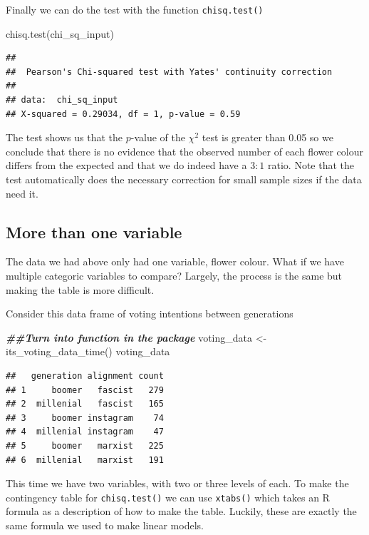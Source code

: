 \documentclass[
]{book}
\newenvironment{Shaded}{\begin{snugshade}}{\end{snugshade}}
\newcommand{\DocumentationTok}[1]{\textcolor[rgb]{0.56,0.35,0.01}{\textbf{\textit{#1}}}}
\newcommand{\FunctionTok}[1]{\textcolor[rgb]{0.00,0.00,0.00}{#1}}
\newcommand{\NormalTok}[1]{#1}
\newcommand{\OtherTok}[1]{\textcolor[rgb]{0.56,0.35,0.01}{#1}}
\begin{document}
Finally we can do the test with the function \texttt{chisq.test()}

\begin{Shaded}
\begin{Highlighting}[]
\FunctionTok{chisq.test}\NormalTok{(chi\_sq\_input)}
\end{Highlighting}
\end{Shaded}

\begin{verbatim}
## 
## 	Pearson's Chi-squared test with Yates' continuity correction
## 
## data:  chi_sq_input
## X-squared = 0.29034, df = 1, p-value = 0.59
\end{verbatim}

The test shows us that the \(p\)-value of the \(\chi^2\) test is greater than 0.05 so we conclude that there is no evidence that the observed number of each flower colour differs from the expected and that we do indeed have a \(3:1\) ratio. Note that the test automatically does the necessary correction for small sample sizes if the data need it.

\hypertarget{more-than-one-variable}{%
\subsection{More than one variable}\label{more-than-one-variable}}

The data we had above only had one variable, flower colour. What if we have multiple categoric variables to compare? Largely, the process is the same but making the table is more difficult.

Consider this data frame of voting intentions between generations

\begin{Shaded}
\begin{Highlighting}[]
\DocumentationTok{\#\#Turn into function in the package}
\NormalTok{voting\_data }\OtherTok{\textless{}{-}} \FunctionTok{its\_voting\_data\_time}\NormalTok{()}
\NormalTok{voting\_data}
\end{Highlighting}
\end{Shaded}

\begin{verbatim}
##   generation alignment count
## 1     boomer   fascist   279
## 2  millenial   fascist   165
## 3     boomer instagram    74
## 4  millenial instagram    47
## 5     boomer   marxist   225
## 6  millenial   marxist   191
\end{verbatim}

This time we have two variables, with two or three levels of each. To make the contingency table for \texttt{chisq.test()} we can use \texttt{xtabs()} which takes an R formula as a description of how to make the table. Luckily, these are exactly the same formula we used to make linear models.
\end{document}
